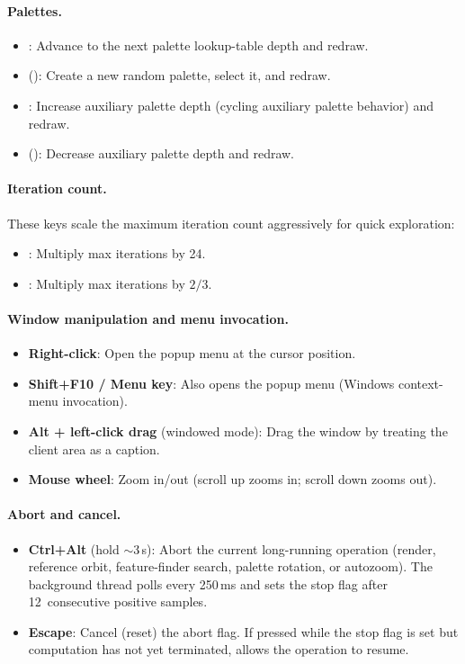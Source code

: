 \paragraph{Palettes.}
\begin{itemize}
  \item {}: Advance to the next palette lookup-table depth and redraw.
  \item {} (): Create a new random palette, select it, and redraw.
  \item {}: Increase auxiliary palette depth (cycling auxiliary palette behavior) and redraw.
  \item {} (): Decrease auxiliary palette depth and redraw.
\end{itemize}

\paragraph{Iteration count.}
These keys scale the maximum iteration count aggressively for quick exploration:
\begin{itemize}
  \item \code{=} : Multiply max iterations by 24.
  \item \code{-} : Multiply max iterations by $2/3$.
\end{itemize}

\paragraph{Window manipulation and menu invocation.}
\begin{itemize}
  \item \textbf{Right-click}: Open the popup menu at the cursor position.
  \item \textbf{Shift+F10 / Menu key}: Also opens the popup menu (Windows context-menu invocation).
  \item \textbf{Alt + left-click drag} (windowed mode): Drag the window by treating the client area as a caption.
  \item \textbf{Mouse wheel}: Zoom in/out (scroll up zooms in; scroll down zooms out).
\end{itemize}

\paragraph{Abort and cancel.}
\begin{itemize}
  \item \textbf{Ctrl+Alt} (hold ${\sim}$3\,s): Abort the current long-running
        operation (render, reference orbit, feature-finder search, palette
        rotation, or autozoom).
        The  background thread polls every 250\,ms
        and sets the stop flag after 12~consecutive positive samples.
  \item \textbf{Escape}: Cancel (reset) the abort flag.  If pressed
        while the stop flag is set but computation has not yet
        terminated, allows the operation to resume.
\end{itemize}


